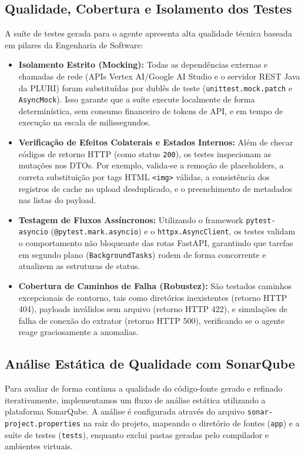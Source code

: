 \documentclass[sigconf]{acmart}
\begin{document}
\subsection{Qualidade, Cobertura e Isolamento dos Testes}
A suíte de testes gerada para o agente apresenta alta qualidade técnica baseada em pilares da Engenharia de Software:
\begin{itemize}
\item \textbf{Isolamento Estrito (Mocking):} Todas as dependências externas e chamadas de rede (APIs Vertex AI/Google AI Studio e o servidor REST Java da PLURI) foram substituídas por dublês de teste (\lstinline{unittest.mock.patch} e \lstinline{AsyncMock}). Isso garante que a suíte execute localmente de forma determinística, sem consumo financeiro de tokens de API, e em tempo de execução na escala de milissegundos.
\item \textbf{Verificação de Efeitos Colaterais e Estados Internos:} Além de checar códigos de retorno HTTP (como status \lstinline{200}), os testes inspecionam as mutações nos DTOs. Por exemplo, valida-se a remoção de placeholders, a correta substituição por tags HTML \lstinline{<img>} válidas, a consistência dos registros de cache no upload desduplicado, e o preenchimento de metadados nas listas do payload.
\item \textbf{Testagem de Fluxos Assíncronos:} Utilizando o framework \lstinline{pytest-asyncio} (\lstinline{@pytest.mark.asyncio}) e o \lstinline{httpx.AsyncClient}, os testes validam o comportamento não bloqueante das rotas FastAPI, garantindo que tarefas em segundo plano (\lstinline{BackgroundTasks}) rodem de forma concorrente e atualizem as estruturas de status.
\item \textbf{Cobertura de Caminhos de Falha (Robustez):} São testados caminhos excepcionais de contorno, tais como diretórios inexistentes (retorno HTTP 404), payloads inválidos sem arquivo (retorno HTTP 422), e simulações de falha de conexão do extrator (retorno HTTP 500), verificando se o agente reage graciosamente a anomalias.
\end{itemize}

\subsection{Análise Estática de Qualidade com SonarQube}
Para avaliar de forma contínua a qualidade do código-fonte gerado e refinado iterativamente, implementamos um fluxo de análise estática utilizando a plataforma SonarQube. A análise é configurada através do arquivo \lstinline{sonar-project.properties} na raiz do projeto, mapeando o diretório de fontes (\lstinline{app}) e a suíte de testes (\lstinline{tests}), enquanto exclui pastas geradas pelo compilador e ambientes virtuais.
\end{document}
